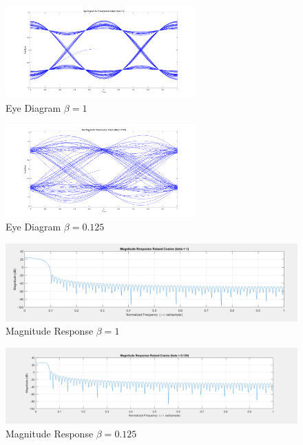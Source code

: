 \documentclass{article}
\begin{document}
\begin{figure}[h]
  \begin{center}
    \includegraphics[width=0.65\textwidth]{img/eye_diagram_beta_1.png}
    \caption{Eye Diagram $\beta = 1$}
  \end{center}
\end{figure}

\begin{figure}[h]
  \begin{center}
    \includegraphics[width=0.65\textwidth]{img/eye_diagram_beta_125.png}
    \caption{Eye Diagram $\beta = 0.125$}
  \end{center}
\end{figure}

\begin{figure}[h]
  \begin{center}
      \includegraphics[width=\linewidth]{img/magnitude_response_beta_1.png}
      \caption{Magnitude Response $\beta = 1$}
  \end{center}
\end{figure}

\begin{figure}[h]
  \begin{center}
      \includegraphics[width=\linewidth]{img/magnitude_response_beta_125.png}
      \caption{Magnitude Response $\beta = 0.125$}
  \end{center}
\end{figure}
\end{document}
